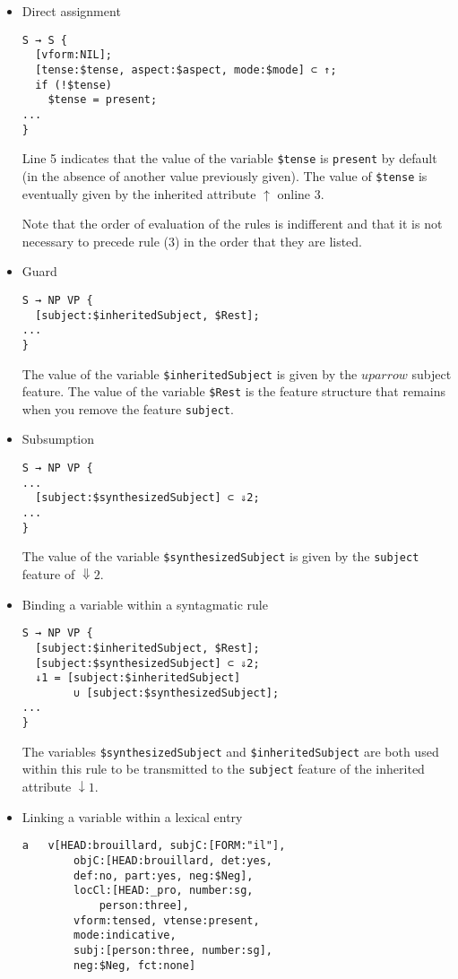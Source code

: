 \documentclass[11pt]{article}
\begin{document}
\begin{itemize}
\item Direct assignment
\begin{lstlisting}
S → S {
  [vform:NIL];
  [tense:$tense, aspect:$aspect, mode:$mode] ⊂ ↑;
  if (!$tense)
    $tense = present;
...
}
\end{lstlisting}
Line 5 indicates that the value of the variable \verb#$tense# is
\verb#present# by default (in the absence of another value previously given). The
value of
\verb#$tense# is eventually given by the inherited attribute
$\uparrow$ online 3.

Note that the order of evaluation of the rules is indifferent and that it
is not necessary to precede rule (3) in the order that they are listed.

\item Guard
\begin{lstlisting}[numbers=none]
S → NP VP {
  [subject:$inheritedSubject, $Rest];
...
}
\end{lstlisting}

The value of the variable \verb#$inheritedSubject# is given 
by the $uparrow$ subject feature. The value of the variable 
\verb#$Rest# is the feature structure that remains when you remove the
feature \verb#subject#.

\item Subsumption
\begin{lstlisting}[numbers=none]
S → NP VP {
...
  [subject:$synthesizedSubject] ⊂ ⇓2;
...
}
\end{lstlisting}

The value of the variable \verb#$synthesizedSubject# is given 
by the \verb#subject# feature of $\Downarrow2$. 

\item Binding a variable within a syntagmatic rule
\begin{lstlisting}[numbers=none]
S → NP VP {
  [subject:$inheritedSubject, $Rest];
  [subject:$synthesizedSubject] ⊂ ⇓2;
  ↓1 = [subject:$inheritedSubject] 
  		∪ [subject:$synthesizedSubject];
...
}
\end{lstlisting}

The variables \verb#$synthesizedSubject# and \verb#$inheritedSubject#
are both used within this rule to be
transmitted to the \verb#subject# feature of the inherited attribute $\downarrow1$.

\item Linking a variable within a lexical entry

\begin{lstlisting}[numbers=none]
a	v[HEAD:brouillard, subjC:[FORM:"il"], 
		objC:[HEAD:brouillard, det:yes, 
		def:no, part:yes, neg:$Neg], 
		locCl:[HEAD:_pro, number:sg, 
			person:three], 
		vform:tensed, vtense:present, 
		mode:indicative, 
		subj:[person:three, number:sg], 
		neg:$Neg, fct:none]
\end{lstlisting}


\end{itemize}
\end{document}
